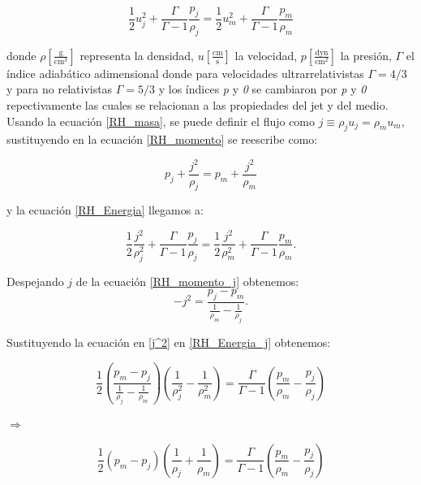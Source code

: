 \documentclass[12pt,a4paper]{book}
\begin{document}
\begin{equation}\label{RH_Energia}
\frac{1}{2} u_{j}^{2}+ \frac{\Gamma}{\Gamma-1} \frac{p_{j}}{\rho_{j}} =
 \frac{1}{2} u_{m}^{2}+ \frac{\Gamma}{\Gamma-1} \frac{p_{m}}{\rho_{m}}
\end{equation}

\noindent donde $\rho \left[\frac{\mathrm{g}}{\mathrm{cm}^3}\right]$ representa la densidad, $u \left[\frac{\mathrm{cm}}{\mathrm{s} }\right]$ la velocidad,  $p \left[\frac{\mathrm{dyn}}{\mathrm{cm}^2} \right]$ 
la presión, $\Gamma$ el índice adiabático adimensional donde para velocidades ultrarrelativistas $\Gamma = 4/3$ y para no relativistas $\Gamma = 5/3$ y los índices \textit{p} y \textit{0} se cambiaron por 
\textit{p} y \textit{0} repectivamente las cuales se relacionan a las propiedades del 
jet y del medio. Usando la ecuación   \ref{RH_masa}, se puede definir el flujo como $j \equiv \rho_j u_j = \rho_m u_m$, sustituyendo en la ecuación \ref{RH_momento} se reescribe como:

\begin{equation}\label{RH_momento_j}
p_{j}+\frac{j^2}{\rho_{j}}=p_{m}+\frac{j^2}{\rho_{m}}
\end{equation}

\noindent y la ecuación \ref{RH_Energia} llegamos a:

\begin{equation}\label{RH_Energia_j}
\frac{1}{2} \frac{j^{2}}{\rho_{j}^2}+\frac{\Gamma}{\Gamma-1} \frac{p_{j}}{\rho_{j}}=
\frac{1}{2} \frac{j^{2}}{\rho_{m}^2}+\frac{\Gamma}{\Gamma-1} \frac{p_{m}}{\rho_{m}}.
\end{equation}

\noindent Despejando $j$ de la ecuación \ref{RH_momento_j} obtenemos:
\begin{equation}\label{j^2}
-j^{2}=\frac{p_{j}-p_{m}}{\frac{1}{\rho_{m}}-\frac{1}{\rho_{j}}}.
\end{equation}

\noindent Sustituyendo la ecuación en \ref{j^2} en \ref{RH_Energia_j} obtenemos:

\begin{equation*}
\frac{1}{2} \left( \frac{p_{m}-p_{j}}{\frac{1}{\rho_{j}}-\frac{1}{\rho_{m}}} \right)
\left(\frac{1}{\rho_{j}^{2}}-\frac{1}{\rho_{m}^{2}} \right)
=
\frac{\Gamma}{\Gamma-1}
\left( \frac{p_{m}}{\rho_{m}}-\frac{p_{j}}{\rho_{j}} \right)
\end{equation*}

$\Rightarrow$

\begin{equation*}
\frac{1}{2}	\left( p_{m} - p_{j} \right)
\left( \frac{1}{\rho_{j}}+\frac{1}{\rho_{m}} \right)
=
\frac{\Gamma}{\Gamma-1}
\left( \frac{p_{m}}{\rho_{m}}-\frac{p_{j}}{\rho_{j}} \right)
\end{equation*}
\end{document}
